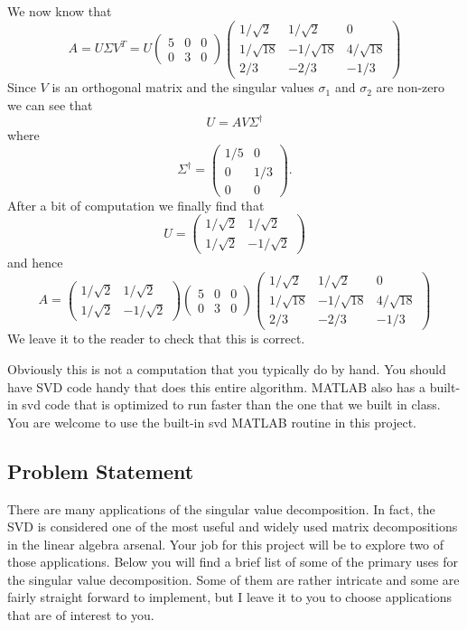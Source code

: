 We now know that 
\[ A = U \Sigma V^T = U \begin{pmatrix} 5 & 0 & 0 \\ 0 & 3 & 0 \end{pmatrix} \begin{pmatrix} 1/\sqrt{2} & 1/\sqrt{2} & 0 \\ 1/\sqrt{18} & -1/\sqrt{18} &
        4/\sqrt{18} \\ 2/3 & -2/3 & -1/3 \end{pmatrix} \]
Since $V$ is an orthogonal matrix and the singular values $\sigma_1$ and $\sigma_2$ are
non-zero we can see that 
\[ U = AV\Sigma^\dagger \]
where 
\[ \Sigma^\dagger = \begin{pmatrix} 1/5 & 0 \\ 0 & 1/3 \\ 0 & 0 \end{pmatrix}. \]
After a bit of computation we finally find that 
\[ U = \begin{pmatrix} 1/\sqrt{2} & 1/\sqrt{2} \\ 1/\sqrt{2} & -1/\sqrt{2} \end{pmatrix}
        \]
and hence
\[ A = \begin{pmatrix} 1/\sqrt{2} & 1/\sqrt{2} \\ 1/\sqrt{2} & -1/\sqrt{2} \end{pmatrix} \begin{pmatrix} 5 & 0 & 0 \\ 0 & 3 & 0 \end{pmatrix} \begin{pmatrix} 1/\sqrt{2} & 1/\sqrt{2} & 0 \\ 1/\sqrt{18} & -1/\sqrt{18} &
        4/\sqrt{18} \\ 2/3 & -2/3 & -1/3 \end{pmatrix} \]
We leave it to the reader to check that this is correct.  

Obviously this is not a computation that you typically do by hand.  You should have SVD
code handy that does this entire algorithm.  MATLAB also has a built-in svd code that is
optimized to run faster than the one that we built in class.  You are welcome to use the
built-in svd MATLAB routine in this project.

\subsection*{Problem Statement}
There are many applications of the singular value decomposition.  In fact, the SVD is
considered one of the most useful and widely used matrix decompositions in the linear
algebra arsenal.  Your job for this project will be to explore two of those applications.
Below you will find a brief list of some of the primary uses for the singular value
decomposition.  Some of them are rather intricate and some are fairly straight forward to
implement, but I leave it to you to choose applications that are of interest to you.

